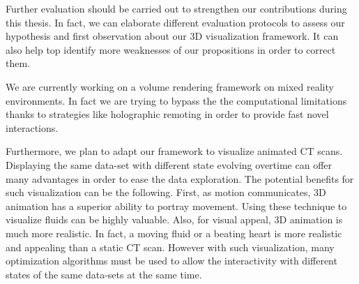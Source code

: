 Further evaluation should be carried out to strengthen our contributions during this thesis. In fact, we can elaborate different evaluation protocols to assess our hypothesis and first observation about our 3D visualization framework. It can also help top identify more weaknesses of our propositions in order to correct them. 

We are currently working on a  volume rendering framework on mixed reality environments.  In fact we are trying to bypass the the computational limitations thanks to strategies like holographic remoting in order to provide fast novel interactions. 

Furthermore, we plan to adapt our framework to visualize animated CT scans. Displaying the same data-set with
 different state evolving overtime can offer many advantages in order to ease the data exploration. The potential
 benefits for such visualization can be the following. First, as motion communicates, 3D animation has a superior 
 ability to portray movement. Using these technique to visualize fluids can be highly valuable. Also, for visual
 appeal, 3D animation is much more realistic. In fact, a moving fluid or a beating heart is more realistic and
 appealing than a static CT scan. However with such visualization, many optimization algorithms must be used to
     allow the interactivity with different states of the same data-sets at the same time.
     

     